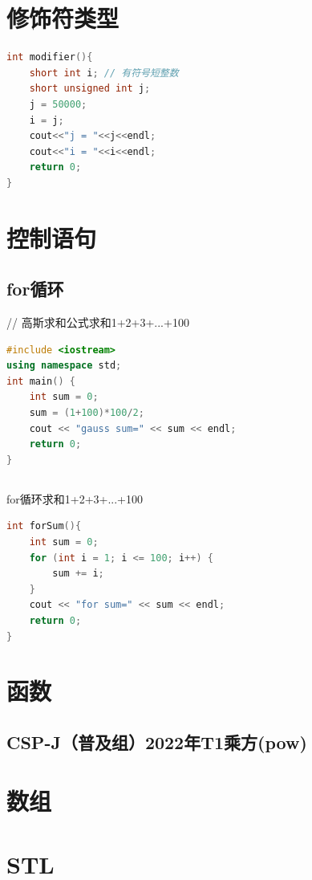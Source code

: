 \documentclass[12pt,twiside,a4paper]{ctexbook}
\numberwithin{chapter}{part}
\begin{document}
\chapter{修饰符类型}
\begin{lstlisting}[language=C++]
int modifier(){
	short int i; // 有符号短整数
	short unsigned int j;
	j = 50000;
	i = j;
	cout<<"j = "<<j<<endl;	
	cout<<"i = "<<i<<endl;	
	return 0;
}
\end{lstlisting}

\chapter{控制语句}
\section{for循环}
// 高斯求和公式求和1+2+3+...+100
\begin{lstlisting}[language=C++]
#include <iostream>
using namespace std;
int main() {
    int sum = 0;
    sum = (1+100)*100/2;
    cout << "gauss sum=" << sum << endl;
    return 0;
}
\end{lstlisting}

\section{}
for循环求和1+2+3+...+100\\
\begin{lstlisting}[language=C++]
int forSum(){
    int sum = 0;
    for (int i = 1; i <= 100; i++) {
        sum += i;
    }
    cout << "for sum=" << sum << endl;
    return 0;
}
\end{lstlisting}

\chapter{函数}
\section{CSP-J（普及组）2022年T1乘方(pow)}

\chapter{数组}

\chapter{STL}
\end{document}
